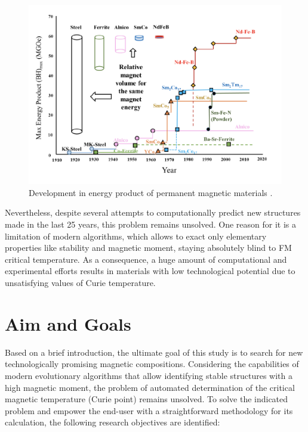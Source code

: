 \begin{figure}[H]
	\centering
	\includegraphics{fig/review/history.png}
	\caption[Development in energy product of permanent magnetic materials]{Development in energy product of permanent magnetic materials \cite{Gutfleisch2010}.}
	\label{fig:history}
\end{figure}

Nevertheless, despite several attempts to computationally predict new structures made in the last 25 years, this problem remains unsolved. One reason for it is a limitation of modern algorithms, which allows to exact only elementary properties like stability and magnetic moment, staying absolutely blind to FM critical temperature. As a consequence, a huge amount of computational and experimental efforts results in materials with low technological potential due to unsatisfying values of Curie temperature. 


\cleardoublepage
\section{Aim and Goals}


Based on a brief introduction, the ultimate goal of this study is to search for new technologically promising magnetic compositions. Considering the capabilities of modern evolutionary algorithms that allow identifying stable structures with a high magnetic moment, the problem of automated determination of the critical magnetic temperature (Curie point) remains unsolved. To solve the indicated problem and empower the end-user with a straightforward methodology for its calculation, the following research objectives are identified:


